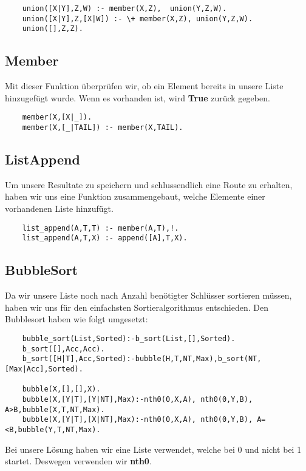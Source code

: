 \begin{verbatim}
    union([X|Y],Z,W) :- member(X,Z),  union(Y,Z,W).
    union([X|Y],Z,[X|W]) :- \+ member(X,Z), union(Y,Z,W).
    union([],Z,Z).
\end{verbatim}

\subsection{Member}
Mit dieser Funktion überprüfen wir, ob ein Element bereits in 
unsere Liste hinzugefügt wurde. Wenn es vorhanden ist, wird \textbf{True}
zurück gegeben.

\begin{verbatim}
    member(X,[X|_]).
    member(X,[_|TAIL]) :- member(X,TAIL).
\end{verbatim}

\newpage

\subsection{ListAppend}
Um unsere Resultate zu speichern und schlussendlich eine Route zu erhalten, 
haben wir uns eine Funktion zusammengebaut, welche Elemente einer vorhandenen 
Liste hinzufügt.

\begin{verbatim}
    list_append(A,T,T) :- member(A,T),!.
    list_append(A,T,X) :- append([A],T,X).
\end{verbatim}

\subsection{BubbleSort}
Da wir unsere Liste noch nach Anzahl benötigter Schlüsser sortieren
müssen, haben wir uns für den einfachsten Sortieralgorithmus 
entschieden. Den Bubblesort haben wie folgt umgesetzt:

\begin{verbatim}
    bubble_sort(List,Sorted):-b_sort(List,[],Sorted).
    b_sort([],Acc,Acc).
    b_sort([H|T],Acc,Sorted):-bubble(H,T,NT,Max),b_sort(NT,[Max|Acc],Sorted).
    
    bubble(X,[],[],X).
    bubble(X,[Y|T],[Y|NT],Max):-nth0(0,X,A), nth0(0,Y,B), A>B,bubble(X,T,NT,Max).
    bubble(X,[Y|T],[X|NT],Max):-nth0(0,X,A), nth0(0,Y,B), A=<B,bubble(Y,T,NT,Max).
\end{verbatim}

\noindent
Bei unsere Lösung haben wir eine Liste verwendet, welche bei 0 und nicht bei 1
startet. Deswegen verwenden wir \textbf{nth0}.

